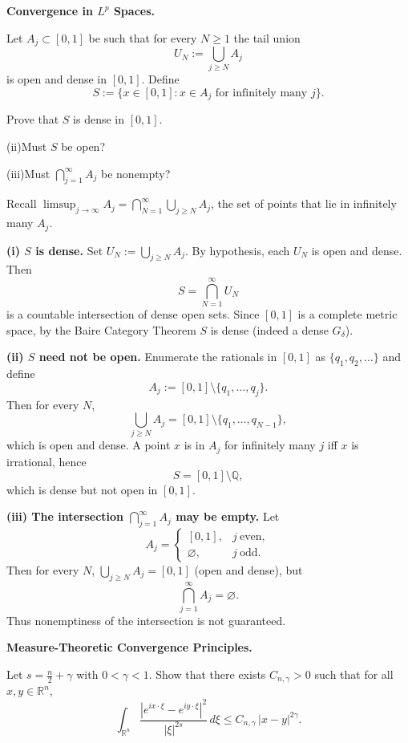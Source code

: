 \begin{problem}[CP-II-0104]
\label{prob:cp-ii-0104}
\textbf{Convergence in \(L^p\) Spaces.}

	Let $A_j\subset[0,1]$ be such that for every $N\ge1$ the tail union
	\[
	U_N:=\bigcup_{j\ge N} A_j
	\]
	is open and dense in $[0,1]$. Define
	\[
	S:=\{x\in[0,1]: x\in A_j \text{ for infinitely many } j\}.
	\]

		 Prove that $S$ is dense in $[0,1]$.
		\par\noindent (ii)\quad Must $S$ be open?
		\par\noindent (iii)\quad Must $\bigcap_{j=1}^\infty A_j$ be nonempty?
\end{problem}

\begin{solution}
Recall $\displaystyle \limsup_{j\to\infty} A_j=\bigcap_{N=1}^\infty \bigcup_{j\ge N} A_j$,
	the set of points that lie in infinitely many $A_j$.

	\medskip
	\textbf{(i) $S$ is dense.}
	Set $U_N:=\bigcup_{j\ge N} A_j$. By hypothesis, each $U_N$ is open and dense.
	Then
	\[
	S=\bigcap_{N=1}^{\infty} U_N
	\]
	is a countable intersection of dense open sets. Since $[0,1]$ is a complete metric space,
	by the Baire Category Theorem $S$ is dense (indeed a dense $G_\delta$).

	\medskip
	\textbf{(ii) $S$ need not be open.}
	Enumerate the rationals in $[0,1]$ as $\{q_1,q_2,\dots\}$ and define
	\[
	A_j:=[0,1]\setminus\{q_1,\dots,q_j\}.
	\]
	Then for every $N$,
	\[
	\bigcup_{j\ge N} A_j=[0,1]\setminus\{q_1,\dots,q_{N-1}\},
	\]
	which is open and dense. A point $x$ is in $A_j$ for infinitely many $j$ iff $x$ is irrational,
	hence
	\[
	S=[0,1]\setminus\mathbb{Q},
	\]
	which is dense but not open in $[0,1]$.

	\medskip
	\textbf{(iii) The intersection $\bigcap_{j=1}^\infty A_j$ may be empty.}
	Let
	\[
	A_j=
	\begin{cases}
		[0,1], & j\ \text{even},\\
		\varnothing, & j\ \text{odd}.
	\end{cases}
	\]
	Then for every $N$, $\bigcup_{j\ge N} A_j=[0,1]$ (open and dense), but
	\[
	\bigcap_{j=1}^\infty A_j=\varnothing.
	\]
	Thus nonemptiness of the intersection is not guaranteed.
\end{solution}

\begin{problem}[CP-II-0105]
\label{prob:cp-ii-0105}
\textbf{Measure-Theoretic Convergence Principles.}

\hspace*{1.5em}Let $s=\frac n2+\gamma$ with $0<\gamma<1$. Show that there exists $C_{n,\gamma}>0$ such that for all $x,y\in\mathbb R^n$,
\[
\int_{\mathbb R^n}\frac{|e^{ix\cdot\xi}-e^{iy\cdot\xi}|^2}{|\xi|^{2s}}\,d\xi
\le C_{n,\gamma}\,|x-y|^{2\gamma}.
\]
\end{problem}


